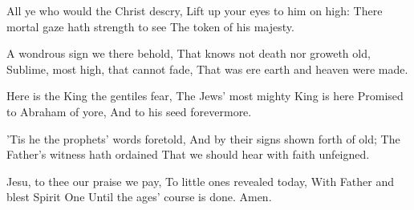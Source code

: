 All ye who would the Christ descry,
Lift up your eyes to him on high:
There mortal gaze hath strength to see
The token of his majesty.

A wondrous sign we there behold,
That knows not death nor groweth old,
Sublime, most high, that cannot fade,
That was ere earth and heaven were made.

Here is the King the gentiles fear,
The Jews' most mighty King is here
Promised to Abraham of yore,
And to his seed forevermore.

'Tis he the prophets' words foretold,
And by their signs shown forth of old;
The Father's witness hath ordained
That we should hear with faith unfeigned.

Jesu, to thee our praise we pay,
To little ones revealed today,
With Father and blest Spirit One
Until the ages' course is done.
Amen.